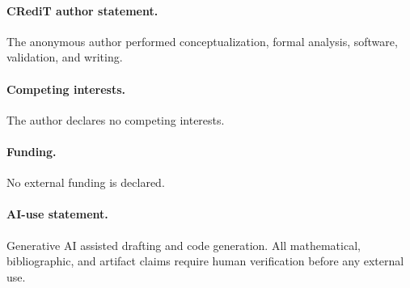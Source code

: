 \documentclass[a4paper,10pt]{amsart}
\theoremstyle{remark}
\begin{document}
\paragraph{CRediT author statement.}
The anonymous author performed conceptualization, formal analysis, software,
validation, and writing.
\paragraph{Competing interests.}
The author declares no competing interests.
\paragraph{Funding.}
No external funding is declared.
\paragraph{AI-use statement.}
Generative AI assisted drafting and code generation.  All mathematical,
bibliographic, and artifact claims require human verification before any
external use.



\end{document}
